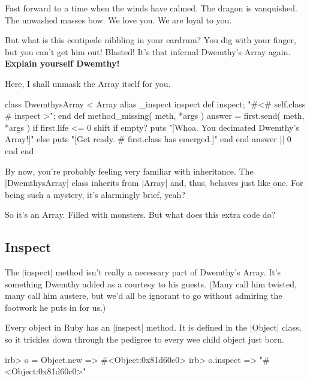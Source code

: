 \documentclass[12pt,twoside]{report}
\begin{document}
Fast forward to a time when the winds have calmed.  The dragon is
vanquished.  The unwashed masses bow.  We love you. We are loyal to
you.

But what is this centipede nibbling in your eardrum?  You dig with
your finger, but you can't get him out!  Blasted!  It's that infernal
Dwemthy's Array again.  {\bf Explain yourself Dwemthy!}

Here, I shall unmask the Array itself for you.


\begin{rubycode}

 class DwemthysArray < Array
   alias _inspect inspect
   def inspect; "#<#{ self.class }#{ inspect }>"; end
   def method_missing( meth, *args )
     answer = first.send( meth, *args )
     if first.life <= 0
       shift
       if empty?
         puts "[Whoa.  You decimated Dwemthy's Array!]"
       else
         puts "[Get ready. #{ first.class } has emerged.]"
       end
     end
     answer || 0
   end
 end

\end{rubycode}


By now, you're probably feeling very familiar with inheritance.  The
\rubyinline|DwemthysArray| class inherits from
\rubyinline|Array| and, thus, behaves just like one.
For being such a mystery, it's alarmingly brief, yeah?

So it's an Array.  Filled with monsters.  But what does this extra
code do?



\subsection{Inspect}



The \rubyinline|inspect| method isn't really a
necessary part of Dwemthy's Array.  It's something Dwemthy added as a
courtesy to his guests.  (Many call him twisted, many call him
austere, but we'd all be ignorant to go without admiring the footwork
he puts in for us.)

Every object in Ruby has an \rubyinline|inspect|
method.  It is defined in the \rubyinline|Object|
class, so it trickles down through the pedigree to every wee child
object just born.


\begin{consolecode}

 irb> o = Object.new
   => #<Object:0x81d60c0>
 irb> o.inspect
   => "#<Object:0x81d60c0>"

\end{consolecode}
\end{document}
